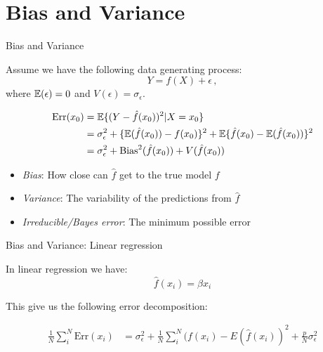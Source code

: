 \documentclass[10pt,handout]{beamer}
\begin{document}



\section{Bias and Variance}
\frame{\sectionpage}

\begin{frame}{Bias and Variance}

Assume we have the following data generating process:
\[
Y = f(X) + \epsilon\,,
\]
where $\operatorname{\mathbb{E}}(\epsilon)=0$ and $V(\epsilon)=\sigma_\epsilon$.

\begin{align*}
\text{Err}(x_0) &= \operatorname{\mathbb{E}}\{(Y-\hat{f}(x_0))^2 | X = x_0\} \\
  &= \sigma^2_\epsilon + \{\operatorname{\mathbb{E}}(\hat{f}(x_0)) - f(x_0)\}^2 + \operatorname{\mathbb{E}}\{\hat{f}(x_0) - \operatorname{\mathbb{E}}(\hat{f}(x_0))\}^2 \\
  &= \sigma^2_\epsilon + \text{Bias}^2(\hat{f}(x_0)) + V(\hat{f}(x_0))
\end{align*}

\begin{itemize}
\item \emph{Bias}: How close can $\hat{f}$ get to the true model $f$
\item \emph{Variance}: The variability of the predictions from $\hat{f}$
\item \emph{Irreducible/Bayes error}: The minimum possible error
\end{itemize}

\end{frame}


\begin{frame}{Bias and Variance: Linear regression}

In linear regression we have:
\[
\hat{f}(x_i) = \hat{\beta} x_i
\]

This give us the following error decomposition:

\begin{align*}
\frac{1}{N}\sum^N_i \text{Err}(x_i) &= \sigma^2_\epsilon + \frac{1}{N}\sum^N_i (f(x_i) - E(\hat{f}(x_i))^2 + \frac{p}{N} \sigma^2_\epsilon
\end{align*}

\end{frame}
\end{document}
